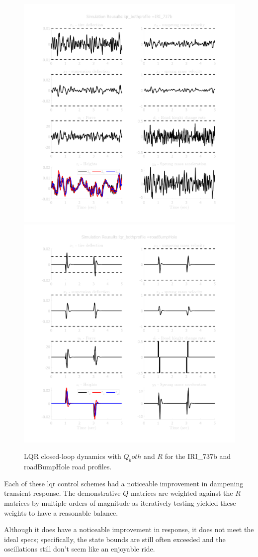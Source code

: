\documentclass[]{IEEEtran}
\begin{document}
\begin{figure}[h]
    \centering
    \includegraphics[width = 0.49 \columnwidth]{figs/results_lqr_both_IRI_737b.png}
    \includegraphics[width = 0.49 \columnwidth]{figs/results_lqr_both_roadBumpHole.png}
    \caption{LQR closed-loop dynamics with $Q_both$ and $R$ for the IRI\_737b  and roadBumpHole road profiles.} \label{fig:lqr_both}
\end{figure}

Each of these lqr control schemes had a noticeable improvement in dampening transient response.
The demonstrative $Q$ matrices are weighted against the $R$ matrices by multiple orders of magnitude as iteratively testing yielded these weights to have a reasonable balance.

Although it does have a noticeable improvement in response, it does not meet the ideal specs; specifically, the state bounds are still often exceeded and the oscillations still don't seem like an enjoyable ride.

\newpage
\end{document}
